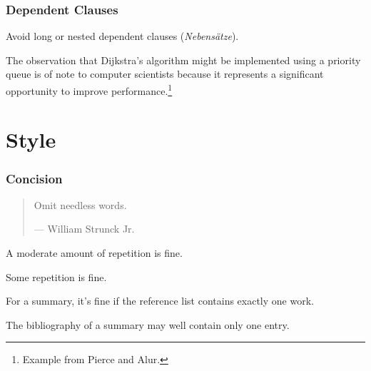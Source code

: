 \begin{frame}
  \frametitle{Dependent Clauses}

  Avoid long or nested dependent clauses (\emph{Nebensätze}).

  \medskip
  \pause


  {
    \small
    The observation that Dijkstra’s algorithm might be implemented using a priority queue is of note to computer scientists because it represents a significant opportunity to improve performance.\footnote{Example from Pierce and Alur.}
  }

  \medskip
  \pause

\end{frame}


\section{Style}

\begin{frame}
  \frametitle{Concision}

  \begin{quote}
    Omit needless words.

    --- William Strunck Jr.
  \end{quote}

  \medskip
  \pause


  A moderate amount of repetition is fine.


  Some repetition is fine.

  \medskip
  \pause


  For a summary, it's fine if the reference list contains exactly one work.


  The bibliography of a summary may well contain only one entry.
\end{frame}

